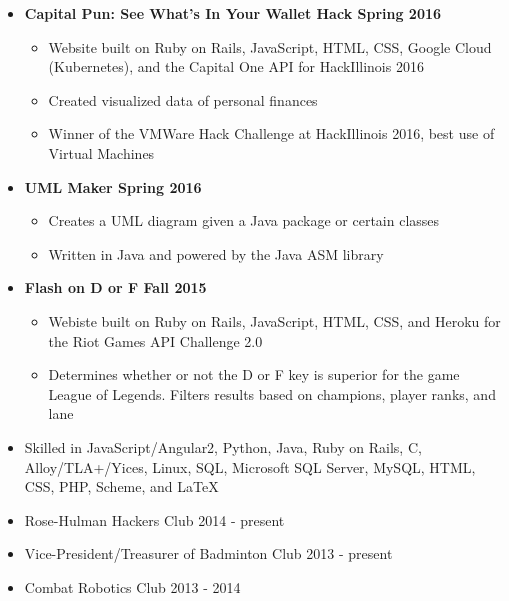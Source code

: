 \documentclass[10pt]{article} %
\begin{document}
\begin{itemize}
	\item[] \textbf{Capital Pun: See What's In Your Wallet Hack \hfill \textmd{Spring 2016}}
	\begin{itemize}
		\item  Website built on Ruby on Rails, JavaScript, HTML, CSS, Google Cloud (Kubernetes), and the Capital One API for HackIllinois 2016
		\item Created visualized data of personal finances
		\item Winner of the VMWare Hack Challenge at HackIllinois 2016, best use of Virtual Machines
	\end{itemize}
	\item[] \textbf{UML Maker \hfill \textmd{Spring 2016}}
	\begin{itemize}
		\item Creates a UML diagram given a Java package or certain classes
		\item Written in Java and powered by the Java ASM library
	\end{itemize}
	\item[] \textbf{Flash on D or F \hfill \textmd{Fall 2015}}
	\begin{itemize}
		\item Webiste built on Ruby on Rails, JavaScript, HTML, CSS, and Heroku for the Riot Games API Challenge 2.0
		\item Determines whether or not the D or F key is superior for the game League of Legends. Filters results based on champions, player ranks, and lane
	\end{itemize}
\end{itemize}
\begin{itemize}
	\item[]  Skilled in JavaScript/Angular2, Python, Java, Ruby on Rails, C, Alloy/TLA+/Yices, Linux, SQL, Microsoft SQL Server, MySQL, HTML, CSS, PHP, Scheme, and \LaTeX
\end{itemize}
\begin{itemize}
	\item[] Rose-Hulman Hackers Club \hfill 2014 - present
	\item[] Vice-President/Treasurer of Badminton Club \hfill 2013 - present
	\item[] Combat Robotics Club \hfill 2013 - 2014
\end{itemize}
\
\end{document}
